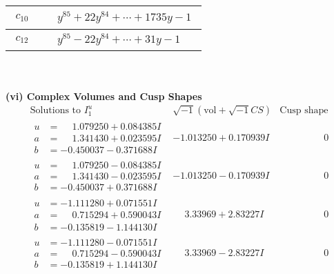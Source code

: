\documentclass[1p]{elsarticle_modified}
\theoremstyle{definition}
\newcommand{\I}{\sqrt{-1}}
\begin{document}
\begin{tabular}{m{50pt}|m{274pt}}
\hline $$\begin{aligned}c_{10}\end{aligned}$$&$\begin{aligned}
&y^{85}+22 y^{84}+\cdots+1735 y-1
\end{aligned}$\\
\hline $$\begin{aligned}c_{12}\end{aligned}$$&$\begin{aligned}
&y^{85}-22 y^{84}+\cdots+31 y-1
\end{aligned}$\\
\hline
\end{tabular}\\~\\
\newpage\flushleft \textbf{(vi) Complex Volumes and Cusp Shapes}
$$\begin{array}{c|c|c}  
\text{Solutions to }I^u_{1}& \I (\text{vol} + \sqrt{-1}CS) & \text{Cusp shape}\\
 \hline 
\begin{aligned}
u &= \phantom{-}1.079250 + 0.084385 I \\
a &= \phantom{-}1.341430 + 0.023595 I \\
b &= -0.450037 - 0.371688 I\end{aligned}
 & -1.013250 + 0.170939 I & \phantom{-0.000000 } 0 \\ \hline\begin{aligned}
u &= \phantom{-}1.079250 - 0.084385 I \\
a &= \phantom{-}1.341430 - 0.023595 I \\
b &= -0.450037 + 0.371688 I\end{aligned}
 & -1.013250 - 0.170939 I & \phantom{-0.000000 } 0 \\ \hline\begin{aligned}
u &= -1.111280 + 0.071551 I \\
a &= \phantom{-}0.715294 + 0.590043 I \\
b &= -0.135819 - 1.144130 I\end{aligned}
 & \phantom{-}3.33969 + 2.83227 I & \phantom{-0.000000 } 0 \\ \hline\begin{aligned}
u &= -1.111280 - 0.071551 I \\
a &= \phantom{-}0.715294 - 0.590043 I \\
b &= -0.135819 + 1.144130 I\end{aligned}
 & \phantom{-}3.33969 - 2.83227 I & \phantom{-0.000000 } 0 \\ \hline\begin{aligned}

\end{aligned}
\end{array}$$
\end{document}
